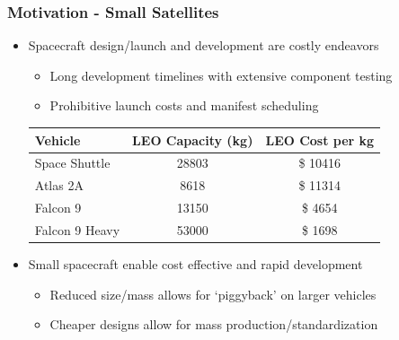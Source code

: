 
\begin{frame} %
\frametitle{Motivation - Small Satellites} %
    \begin{itemize}
        \item Spacecraft design/launch and development are costly endeavors
            \begin{itemize}
                \item Long development timelines with extensive component testing
                \item Prohibitive launch costs and manifest scheduling
            \end{itemize}
            \pause
        \begin{table}
        \begin{tabular}{l | c | c }
            Vehicle & LEO Capacity (\si{\kilogram}) & LEO Cost per \si{\kilogram} \\
            \hline \hline
            Space Shuttle & \num{28803} & \$ \num{10416}  \\ 
            Atlas 2A & \num{8618} & \$ \num{11314} \\
            Falcon 9 & \num{13150} & \$ \num{4654} \\
            Falcon 9 Heavy & \num{53000} & \$ \num{1698}
        \end{tabular}
        \end{table}
        \item Small spacecraft enable cost effective and rapid development
    
            \begin{itemize}
                \item Reduced size/mass allows for `piggyback' on larger vehicles
                \item Cheaper designs allow for mass production/standardization 
            \end{itemize}

    \end{itemize}
    
\end{frame}   %

